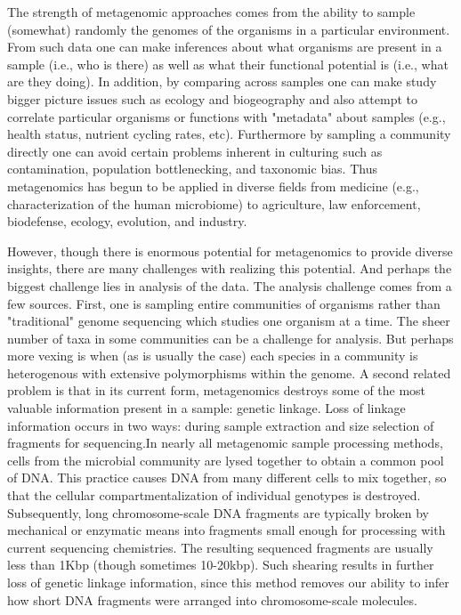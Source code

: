 \documentclass[10pt]{article}
\begin{document}
The strength of metagenomic approaches comes from the ability to sample (somewhat) randomly the genomes of the organisms in a particular environment.  From such data one can make inferences about what organisms are present in a sample (i.e., who is there) as well as what their functional potential is (i.e., what are they doing).  In addition, by comparing across samples one can make study bigger picture issues such as ecology and biogeography and also attempt to correlate particular organisms or functions with "metadata" about samples (e.g., health status, nutrient cycling rates, etc).  Furthermore by sampling a community directly one can avoid certain problems inherent in culturing such as contamination, population bottlenecking, and taxonomic bias.  Thus metagenomics has begun to be applied in diverse fields from medicine (e.g., characterization of the human microbiome) to agriculture, law enforcement, biodefense, ecology, evolution, and industry. 

However, though there is enormous potential for metagenomics to provide diverse insights, there are many challenges with realizing this potential.  And perhaps the biggest challenge lies in analysis of the data.  The analysis challenge comes from a few sources.  First, one is sampling entire communities of organisms rather than "traditional" genome sequencing which studies one organism at a time.  The sheer number of taxa in some communities can be a challenge for analysis.  But perhaps more vexing is when (as is usually the case) each species in a community is heterogenous with extensive polymorphisms within the genome.  A second related problem is that in its current form, metagenomics destroys some of the most valuable information present in a sample: genetic linkage. Loss of linkage information occurs in two ways: during sample extraction and size selection of fragments for sequencing.In nearly all metagenomic sample processing methods, cells from the microbial community are lysed together to obtain a common pool of DNA. This practice causes DNA from many different cells to mix together, so that the cellular compartmentalization of individual genotypes is destroyed.
Subsequently, long chromosome-scale DNA fragments are typically broken by mechanical or enzymatic means into fragments small enough for processing with current sequencing chemistries.  The resulting sequenced fragments are usually less than 1Kbp (though sometimes 10-20kbp).  Such shearing results in further loss of  genetic linkage information, since this method removes our ability to infer how short DNA fragments were arranged into chromosome-scale molecules.
\end{document}
